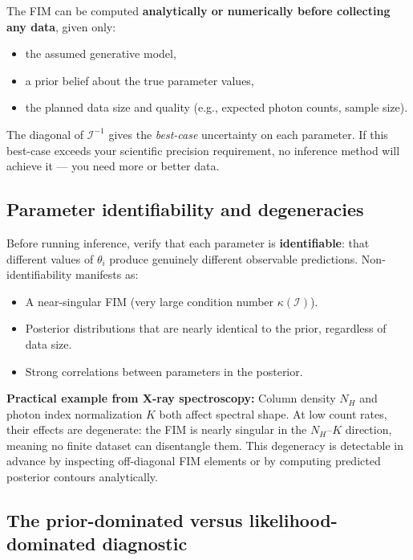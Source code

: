 \documentclass[11pt, a4paper]{article}
\begin{document}
The FIM can be computed \textbf{analytically or numerically before collecting any data},
given only:
\begin{itemize}[noitemsep]
    \item the assumed generative model,
    \item a prior belief about the true parameter values,
    \item the planned data size and quality (e.g., expected photon counts, sample size).
\end{itemize}

The diagonal of $\mathcal{I}^{-1}$ gives the \emph{best-case} uncertainty on each
parameter. If this best-case exceeds your scientific precision requirement, no
inference method will achieve it --- you need more or better data.

\subsection{Parameter identifiability and degeneracies}

Before running inference, verify that each parameter is \textbf{identifiable}: that
different values of $\theta_i$ produce genuinely different observable predictions.
Non-identifiability manifests as:

\begin{itemize}[noitemsep]
    \item A near-singular FIM (very large condition number $\kappa(\mathcal{I})$).
    \item Posterior distributions that are nearly identical to the prior, regardless
          of data size.
    \item Strong correlations between parameters in the posterior.
\end{itemize}

\textbf{Practical example from X-ray spectroscopy:}
Column density $N_H$ and photon index normalization $K$ both affect spectral shape.
At low count rates, their effects are degenerate: the FIM is nearly singular in the
$N_H$--$K$ direction, meaning no finite dataset can disentangle them. This degeneracy
is detectable in advance by inspecting off-diagonal FIM elements or by computing
predicted posterior contours analytically.

\subsection{The prior-dominated versus likelihood-dominated diagnostic}
\end{document}
